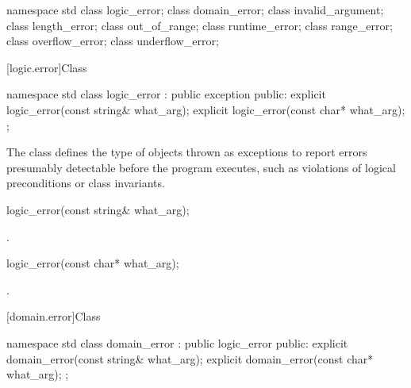 \begin{codeblock}
namespace std {
  class logic_error;
    class domain_error;
    class invalid_argument;
    class length_error;
    class out_of_range;
  class runtime_error;
    class range_error;
    class overflow_error;
    class underflow_error;
}
\end{codeblock}

[logic.error]{Class }

%
\begin{codeblock}
namespace std {
  class logic_error : public exception {
  public:
    explicit logic_error(const string& what_arg);
    explicit logic_error(const char* what_arg);
  };
}
\end{codeblock}

\pnum
The class
defines the type of objects thrown as
exceptions to report errors presumably detectable before
the program executes, such as violations of logical preconditions or class
invariants.

%
\begin{itemdecl}
logic_error(const string& what_arg);
\end{itemdecl}

\begin{itemdescr}
\pnum
{}

\pnum
\ensures
{}.
\end{itemdescr}

%
\begin{itemdecl}
logic_error(const char* what_arg);
\end{itemdecl}

\begin{itemdescr}
\pnum
{}

\pnum
\ensures
{}.
\end{itemdescr}

[domain.error]{Class }

%
\begin{codeblock}
namespace std {
  class domain_error : public logic_error {
  public:
    explicit domain_error(const string& what_arg);
    explicit domain_error(const char* what_arg);
  };
}
\end{codeblock}

